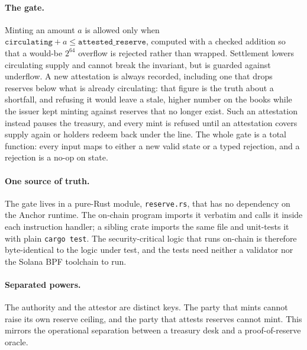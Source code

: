 \documentclass[10pt,twocolumn]{article}
\begin{document}
\paragraph{The gate.} Minting an amount $a$ is allowed only when
$\texttt{circulating} + a \le \texttt{attested\_reserve}$, computed with a checked
addition so that a would-be $2^{64}$ overflow is rejected rather than wrapped.
Settlement lowers circulating supply and cannot break the invariant, but is guarded
against underflow. A new attestation is always recorded, including one that drops
reserves below what is already circulating: that figure is the truth about a
shortfall, and refusing it would leave a stale, higher number on the books while
the issuer kept minting against reserves that no longer exist. Such an attestation
instead pauses the treasury, and every mint is refused until an attestation covers
supply again or holders redeem back under the line. The whole gate is a total
function: every input maps to either a new valid state or a typed rejection, and a
rejection is a no-op on state.

\paragraph{One source of truth.} The gate lives in a pure-Rust module,
\texttt{reserve.rs}, that has no dependency on the Anchor runtime. The on-chain
program imports it verbatim and calls it inside each instruction handler; a
sibling crate imports the same file and unit-tests it with plain \texttt{cargo test}.
The security-critical logic that runs on-chain is therefore byte-identical to the
logic under test, and the tests need neither a validator nor the Solana BPF
toolchain to run.

\paragraph{Separated powers.} The authority and the attestor are distinct keys.
The party that mints cannot raise its own reserve ceiling, and the party that
attests reserves cannot mint. This mirrors the operational separation between a
treasury desk and a proof-of-reserve oracle.
\end{document}
